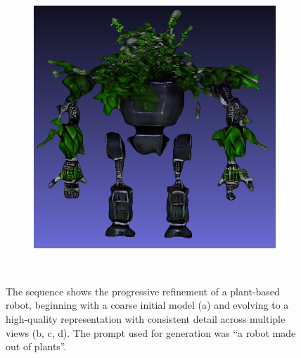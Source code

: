 \begin{figure}[H]
\begin{subfigure}[b]{0.27\textwidth}
        \includegraphics[width=\textwidth]{etc/Genie/plantRobot_fine_back.png}
        \caption{}
    \end{subfigure}
    \caption{The sequence shows the progressive refinement of a plant-based robot, beginning with a coarse initial model (a) and evolving to a high-quality representation with consistent detail across multiple views (b, c, d). The prompt used for generation was ``a robot made out of plants''.}~\label{fig:GenieAI_robot}
\end{figure}

